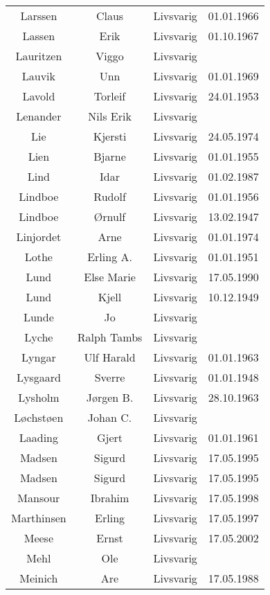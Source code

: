 \begin{tabular}{cccc}
        Larssen	&	Claus	&	Livsvarig 	&	01.01.1966	\\
        Lassen	&	Erik	&	Livsvarig 	&	01.10.1967	\\
        Lauritzen	&	Viggo	&	Livsvarig 	&		\\
        Lauvik	&	Unn	&	Livsvarig 	&	01.01.1969	\\
        Lavold	&	Torleif	&	Livsvarig 	&	24.01.1953	\\
        Lenander	&	Nils Erik	&	Livsvarig 	&		\\
        Lie	&	Kjersti	&	Livsvarig 	&	24.05.1974	\\
        Lien	&	Bjarne	&	Livsvarig 	&	01.01.1955	\\
        Lind	&	Idar	&	Livsvarig 	&	01.02.1987	\\
        Lindboe	&	Rudolf	&	Livsvarig 	&	01.01.1956	\\
        Lindboe	&	Ørnulf	&	Livsvarig 	&	13.02.1947	\\
        Linjordet	&	Arne	&	Livsvarig 	&	01.01.1974	\\
        Lothe	&	Erling A.	&	Livsvarig 	&	01.01.1951	\\
        Lund	&	Else Marie	&	Livsvarig 	&	17.05.1990	\\
        Lund	&	Kjell	&	Livsvarig 	&	10.12.1949	\\
        Lunde	&	Jo	&	Livsvarig 	&		\\
        Lyche	&	Ralph Tambs	&	Livsvarig 	&		\\
        Lyngar	&	Ulf Harald	&	Livsvarig 	&	01.01.1963	\\
        Lysgaard	&	Sverre	&	Livsvarig 	&	01.01.1948	\\
        Lysholm	&	Jørgen B.	&	Livsvarig 	&	28.10.1963	\\
        Løchstøen	&	Johan C.	&	Livsvarig 	&		\\
        Laading	&	Gjert	&	Livsvarig 	&	01.01.1961	\\
        Madsen	&	Sigurd	&	Livsvarig 	&	17.05.1995	\\
        Madsen 	&	Sigurd 	&	Livsvarig 	&	17.05.1995	\\
        Mansour 	&	Ibrahim	&	Livsvarig	&	17.05.1998	\\
        Marthinsen 	&	Erling	&	Livsvarig	&	17.05.1997	\\
        Meese 	&	Ernst	&	Livsvarig	&	17.05.2002	\\
        Mehl	&	Ole	&	Livsvarig 	&		\\
        Meinich	&	Are	&	Livsvarig 	&	17.05.1988	\\

\end{tabular}
